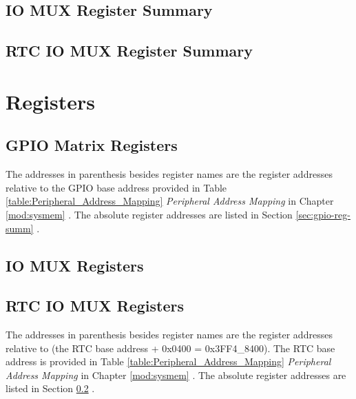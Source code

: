 \documentclass[main\_\_EN.tex]{subfiles}
\begin{document}
\subsection{IO MUX Register Summary}\label{sec:iomux-reg-summ}


\subsection{RTC IO MUX Register Summary}\label{sec:rtcio-reg-summ}


\section{Registers}
\label{section:4.13}
\subsection{GPIO Matrix Registers}
The addresses in parenthesis besides register names are the register addresses relative to the GPIO base address provided in Table \ref{table:Peripheral_Address_Mapping} \textit{Peripheral Address Mapping} in Chapter \ref{mod:sysmem} \textit{}. The absolute register addresses are listed in Section \ref{sec:gpio-reg-summ} \textit{}.



\subsection{IO MUX Registers}

\clearpage


\subsection{RTC IO MUX Registers}
The addresses in parenthesis besides register names are the register addresses relative to (the RTC base address + 0x0400 = 0x3FF4\_8400). The RTC base address is provided in Table \ref{table:Peripheral_Address_Mapping} \textit{Peripheral Address Mapping} in Chapter \ref{mod:sysmem} \textit{}. The absolute register addresses are listed in Section \ref{sec:rtcio-reg-summ} \textit{}.

\end{document}
